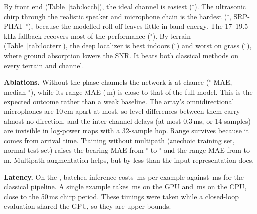 By front end (Table~\ref{tab:locch}), the ideal channel is easiest (\LocdlfullAusBMAE$^\circ$).
The ultrasonic chirp through the realistic speaker and microphone chain is the hardest
(\LocdlfullBusBMAE$^\circ$, SRP-PHAT \LocsrpphatBusBMAE$^\circ$), because the modelled roll-off
leaves little in-band energy. The 17--19.5\,kHz fallback recovers most of the performance
(\LocdlfullBfbBMAE$^\circ$). By terrain (Table~\ref{tab:locterr}), the deep localizer is best
indoors (\LocdlfullindoorBMAE$^\circ$) and worst on grass (\LocdlfullgrassBMAE$^\circ$), where
ground absorption lowers the SNR. It beats both classical methods on every terrain and channel.

\textbf{Ablations.} Without the phase channels the network is at chance
(\LocdlmagBMAE$^\circ$ MAE, median \LocdlmagBMed$^\circ$), while its range MAE
(\LocdlmagRMAE\,m) is close to that of the full model. This is the expected outcome rather than
a weak baseline. The array's omnidirectional microphones are 10\,cm apart at most, so
level differences between them carry almost no direction, and the inter-channel delays (at most
0.3\,ms, or 14 samples) are invisible in log-power maps with a 32-sample hop. Range survives
because it comes from arrival time. Training without multipath (anechoic training set, normal
test set) raises the bearing MAE from \LocdlfullBMAE$^\circ$ to \LocdlanechoicBMAE$^\circ$ and
the range MAE from \LocdlfullRMAE{} to \LocdlanechoicRMAE\,m. Multipath augmentation helps, but
by less than the input representation does.

\textbf{Latency.} On the \GPU, batched inference costs \LatDlFullBatchedMsPerExample\,ms per
example against \LatClassicalBatchedMsPerExample\,ms for the classical pipeline. A single
example takes \LatDlFullSingleMsGpu\,ms on the GPU and \LatDlFullSingleMsCpu\,ms on the CPU, close
to the 50\,ms chirp period. These timings were taken while a closed-loop evaluation shared the
GPU, so they are upper bounds.

\begin{table}[t]
\centering
\caption{Localization on the \NTestSet{} test recordings (all terrains and channels).}
\label{tab:loc}

\end{table}

\begin{table}[t]
\centering
\caption{Bearing MAE / median (deg) by front-end channel, same test set.}
\label{tab:locch}

\end{table}

